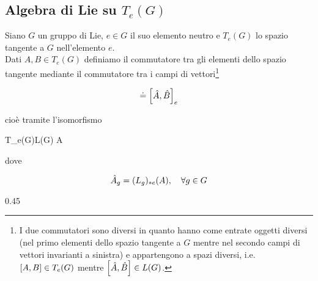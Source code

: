 \subsection{Algebra di Lie su $ T_{e}(G) $}

Siano $ G $ un gruppo di Lie, $ e \in G $ il suo elemento neutro e $ T_{e}(G) $ lo spazio tangente a $ G $ nell'elemento $ e $.\\
Dati $ A,B \in T_{e}(G) $ definiamo il commutatore tra gli elementi dello spazio tangente mediante il commutatore tra i campi di vettori\footnote{%
	I due commutatori sono diversi in quanto hanno come entrate oggetti diversi (nel primo elementi dello spazio tangente a $ G $ mentre nel secondo campi di vettori invarianti a sinistra) e appartengono a spazi diversi, i.e. $ \comm{A}{B} \in T_{e}(G) $ mentre $ \comm{\hat{A}}{\hat{B}} \in L(G) $.%
}

\begin{equation}
	[A,B] \doteq \comm{\hat{A}}{\hat{B}}_{e}
\end{equation}

cioè tramite l'isomorfismo

\map{\hatapp}
	{T_{e}(G)}{L(G)}
	{A}{}
	
dove

\begin{equation}
	\hat{A}_{g} = (L_{g})_{*e}(A) \qcomma \forall g \in G
\end{equation}

	{0.45}{%
			}

